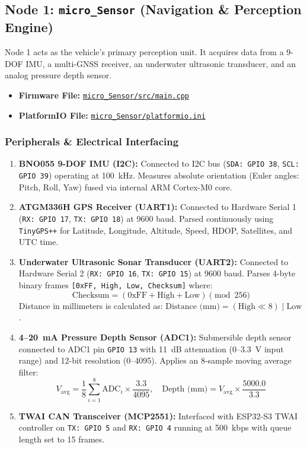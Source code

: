 \documentclass[11pt,a4paper]{article}
\begin{document}
\subsection{Node 1: \texttt{micro\_Sensor} (Navigation \& Perception Engine)}
Node 1 acts as the vehicle's primary perception unit. It acquires data from a 9-DOF IMU, a multi-GNSS receiver, an underwater ultrasonic transducer, and an analog pressure depth sensor.

\begin{itemize}
    \item \textbf{Firmware File:} \href{file:///c:/Users/MP2KC/OneDrive/Documents/PlatformIO/Projects/micro_Sensor/src/main.cpp}{\texttt{micro\_Sensor/src/main.cpp}}
    \item \textbf{PlatformIO File:} \href{file:///c:/Users/MP2KC/OneDrive/Documents/PlatformIO/Projects/micro_Sensor/platformio.ini}{\texttt{micro\_Sensor/platformio.ini}}
\end{itemize}

\subsubsection{Peripherals \& Electrical Interfacing}
\begin{enumerate}
    \item \textbf{BNO055 9-DOF IMU (I2C):} Connected to I2C bus (\texttt{SDA: GPIO 38}, \texttt{SCL: GPIO 39}) operating at 100~kHz. Measures absolute orientation (Euler angles: Pitch, Roll, Yaw) fused via internal ARM Cortex-M0 core.
    \item \textbf{ATGM336H GPS Receiver (UART1):} Connected to Hardware Serial 1 (\texttt{RX: GPIO 17}, \texttt{TX: GPIO 18}) at 9600 baud. Parsed continuously using \texttt{TinyGPS++} for Latitude, Longitude, Altitude, Speed, HDOP, Satellites, and UTC time.
    \item \textbf{Underwater Ultrasonic Sonar Transducer (UART2):} Connected to Hardware Serial 2 (\texttt{RX: GPIO 16}, \texttt{TX: GPIO 15}) at 9600 baud. Parses 4-byte binary frames \texttt{[0xFF, High, Low, Checksum]} where:
    \begin{equation}
        \text{Checksum} = (\text{0xFF} + \text{High} + \text{Low}) \pmod{256}
    \end{equation}
    Distance in millimeters is calculated as: $\text{Distance (mm)} = (\text{High} \ll 8) \mid \text{Low}$.
    \item \textbf{4--20~mA Pressure Depth Sensor (ADC1):} Submersible depth sensor connected to ADC1 pin \texttt{GPIO 13} with 11~dB attenuation (0--3.3~V input range) and 12-bit resolution (0--4095). Applies an 8-sample moving average filter:
    \begin{equation}
        V_{\text{avg}} = \frac{1}{8} \sum_{i=1}^{8} \text{ADC}_i \times \frac{3.3}{4095}, \quad \text{Depth (mm)} = V_{\text{avg}} \times \frac{5000.0}{3.3}
    \end{equation}
    \item \textbf{TWAI CAN Transceiver (MCP2551):} Interfaced with ESP32-S3 TWAI controller on \texttt{TX: GPIO 5} and \texttt{RX: GPIO 4} running at 500~kbps with queue length set to 15 frames.
\end{enumerate}
\end{document}
